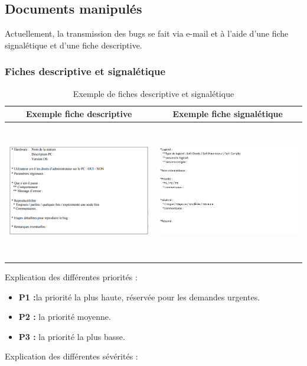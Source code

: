 \documentclass{article}[12pt]
\begin{document}
\newpage
\subsection{Documents manipulés}
Actuellement, la transmission des bugs se fait via e-mail et à l'aide d'une fiche signalétique et d'une fiche descriptive.

\subsubsection{Fiches descriptive et signalétique}
\label{sec:desc}

\begin{table}[!h]
	\centering
	\begin{tabular}[b]{|c|c|}
		\hline
		\textbf{Exemple fiche descriptive} & \textbf{Exemple fiche signalétique } \\
		\hline
		\includegraphics[width=7cm,height=6cm]{fiche_descriptive.png} &\includegraphics[width=7cm,height=6cm]{fiche_signaletique.png} \\
		\hline
	\end{tabular}
	\caption{Exemple de fiches descriptive et signalétique}
\end{table}
\label{sec:sign}
\par
Explication des différentes priorités :

\begin{itemize}
	\item \textbf{P1 :}la priorité la plus haute, réservée pour les demandes urgentes.
	\item \textbf{P2 :} la priorité moyenne.
	\item \textbf{P3 :} la priorité la plus basse.
\end{itemize}
\par
Explication des différentes sévérités :
\end{document}
